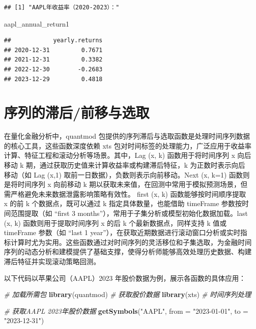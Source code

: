 \documentclass[]{ctexbook}
\newenvironment{Shaded}{\begin{snugshade}}{\end{snugshade}}
\newcommand{\AttributeTok}[1]{\textcolor[rgb]{0.13,0.29,0.53}{#1}}
\newcommand{\CommentTok}[1]{\textcolor[rgb]{0.56,0.35,0.01}{\textit{#1}}}
\newcommand{\FunctionTok}[1]{\textcolor[rgb]{0.13,0.29,0.53}{\textbf{#1}}}
\newcommand{\NormalTok}[1]{#1}
\newcommand{\StringTok}[1]{\textcolor[rgb]{0.31,0.60,0.02}{#1}}
\begin{document}
\begin{verbatim}
## [1] "AAPL年收益率（2020-2023）："
\end{verbatim}

\begin{Shaded}
\begin{Highlighting}[]
\NormalTok{aapl\_annual\_return1 }
\end{Highlighting}
\end{Shaded}

\begin{verbatim}
##            yearly.returns
## 2020-12-31         0.7671
## 2021-12-31         0.3382
## 2022-12-30        -0.2683
## 2023-12-29         0.4818
\end{verbatim}

\section{序列的滞后/前移与选取}\label{ux5e8fux5217ux7684ux6edeux540eux524dux79fbux4e0eux9009ux53d6}

在量化金融分析中，quantmod 包提供的序列滞后与选取函数是处理时间序列数据的核心工具，这些函数深度依赖 xts 包对时间标签的处理能力，广泛应用于收益率计算、特征工程和滚动分析等场景。其中，Lag (x, k) 函数用于将时间序列 x 向后移动 k 期，通过获取历史值来计算收益率或构建滞后特征，k 为正数时表示向后移动（如 Lag (x,1) 取前一日数据），负数则表示向前移动。Next (x, k=1) 函数则是将时间序列 x 向前移动 k 期以获取未来值，在回测中常用于模拟预测场景，但需严格避免未来数据泄露影响策略有效性。
first (x, k) 函数能够按时间顺序提取 x 的前 k 个数据点，既可以通过 k 指定具体数量，也能借助 timeFrame 参数按时间范围提取（如 ``first 3 months''），常用于子集分析或模型初始化数据加载。last (x, k) 函数则用于提取时间序列 x 的后 k 个最新数据点，同样支持 k 值或 timeFrame 参数（如 ``last 1 year''），在获取近期数据进行滚动窗口分析或实时指标计算时尤为实用。这些函数通过对时间序列的灵活移位和子集选取，为金融时间序列的动态分析和建模提供了基础支撑，使得分析师能够高效处理历史数据、构建滞后特征并实现滚动策略回测。

以下代码以苹果公司（AAPL）2023 年股价数据为例，展示各函数的具体应用：

\begin{Shaded}
\begin{Highlighting}[]
\CommentTok{\# 加载所需包}
\FunctionTok{library}\NormalTok{(quantmod)      }\CommentTok{\# 获取股价数据}
\FunctionTok{library}\NormalTok{(xts)           }\CommentTok{\# 时间序列处理}

\CommentTok{\# 获取AAPL 2023年股价数据}
\FunctionTok{getSymbols}\NormalTok{(}\StringTok{"AAPL"}\NormalTok{, }\AttributeTok{from =} \StringTok{"2023{-}01{-}01"}\NormalTok{, }\AttributeTok{to =} \StringTok{"2023{-}12{-}31"}\NormalTok{)}
\end{Highlighting}
\end{Shaded}
\end{document}

